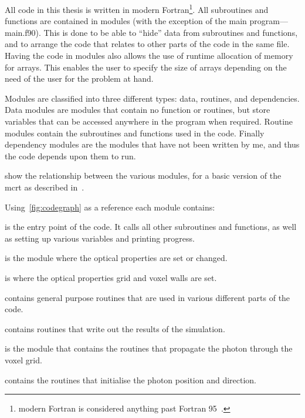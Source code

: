 All code in this thesis is written in modern Fortran\footnote{modern Fortran is considered anything past Fortran 95~\cite{metcalf2011modern}.}.
All subroutines and functions are contained in modules (with the exception of the main program---main.f90).
This is done to be able to ``hide'' data from subroutines and functions, and to arrange the code that relates to other parts of the code in the same file.
Having the code in modules also allows the use of runtime allocation of memory for arrays.
This enables the user to specify the size of arrays depending on the need of the user for the problem at hand.

Modules are classified into three different types: data, routines, and dependencies.
Data modules are modules that contain no function or routines, but store variables that can be accessed anywhere in the program when required.
Routine modules contain the subroutines and functions used in the code.
Finally dependency modules are the modules that have not been written by me, and thus the code depends upon them to run.

 show the relationship between the various modules, for a basic version of the \gls*{mcrt} as described in~.

\medskip
\noindent Using~\cref{fig:codegraph} as a reference each module contains:

 is the entry point of the code. It calls all other subroutines and functions, as well as setting up various variables and printing progress.

 is the module where the optical properties are set or changed.

 is where the optical properties grid and voxel walls are set.

 contains general purpose routines that are used in various different parts of the code.

 contains routines that write out the results of the simulation.

 is the module that contains the routines that propagate the photon through the voxel grid.

 contains the routines that initialise the photon position and direction.

